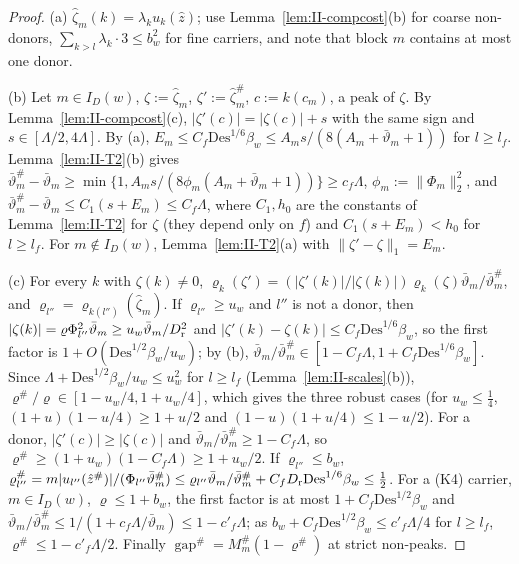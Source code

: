 \documentclass[10pt]{amsart}
\theoremstyle{definition}
\theoremstyle{remark}
\newcommand{\gap}{\operatorname{gap}}
\newcommand{\zh}{\hat z}
\begin{document}
\begin{proof}
(a) $\hat\zeta_m(k)=\lambda_ku_k(\zh)$; use Lemma~\ref{lem:II-compcost}(b)
for coarse non-donors, $\sum_{k>l}\lambda_k\cdot3\le b_w^2$ for fine
carriers, and note that block $m$ contains at most one donor.

(b) Let $m\in I_D(w)$, $\zeta:=\hat\zeta_m$, $\zeta':=\hat\zeta^\#_m$,
$c:=k(c_m)$, a peak of $\zeta$.  By Lemma~\ref{lem:II-compcost}(c),
$|\zeta'(c)|=|\zeta(c)|+s$ with the same sign and $s\in[\Lambda/2,4\Lambda]$.
By (a), $E_m\le C_f\mathrm{Des}^{1/6}\beta_w\le A_ms/(8(A_m+\bar\vartheta_m+1))$ for
$l\ge l_f$.  Lemma~\ref{lem:II-T2}(b) gives $\bar\vartheta^\#_m-\bar\vartheta_m\ge\min\{1,
A_ms/(8\phi_m(A_m+\bar\vartheta_m+1))\}\ge c_f\Lambda$, $\phi_m:=\|\Phi_m\|_2^2$, and
$\bar\vartheta^\#_m-\bar\vartheta_m\le C_1(s+E_m)\le C_f\Lambda$, where $C_1,h_0$ are the
constants of Lemma~\ref{lem:II-T2} for $\zeta$ (they depend only on $f$) and
$C_1(s+E_m)<h_0$ for $l\ge l_f$.  For $m\notin I_D(w)$,
Lemma~\ref{lem:II-T2}(a) with $\|\zeta'-\zeta\|_1=E_m$.

(c) For every $k$ with $\zeta(k)\ne0$, $\varrho_k(\zeta')=(|\zeta'(k)|/
|\zeta(k)|)\varrho_k(\zeta)\bar\vartheta_m/\bar\vartheta^\#_m$, and $\varrho_{l''}=
\varrho_{k(l'')}(\hat\zeta_m)$.  If $\varrho_{l''}\ge u_w$ and $l''$ is not a
donor, then $|\zeta(k)|=\varrho\Phi_{l''}^2\bar\vartheta_m\ge u_w\bar\vartheta_m/D_{\rm r}^2$ and
$|\zeta'(k)-\zeta(k)|\le C_f\mathrm{Des}^{1/6}\beta_w$, so the first factor is
$1+O(\mathrm{Des}^{1/2}\beta_w/u_w)$; by (b), $\bar\vartheta_m/\bar\vartheta^\#_m\in[1-C_f
\Lambda,1+C_f\mathrm{Des}^{1/6}\beta_w]$.  Since $\Lambda+\mathrm{Des}^{1/2}
\beta_w/u_w\le u_w^{2}$ for $l\ge l_f$ (Lemma~\ref{lem:II-scales}(b)),
$\varrho^\#/\varrho\in[1-u_w/4,1+u_w/4]$, which gives the three robust cases
(for $u_w\le\frac14$, $(1+u)(1-u/4)\ge1+u/2$ and $(1-u)(1+u/4)\le1-u/2$).  For
a donor, $|\zeta'(c)|\ge|\zeta(c)|$ and $\bar\vartheta_m/\bar\vartheta^\#_m\ge1-C_f\Lambda$,
so $\varrho^\#\ge(1+u_w)(1-C_f\Lambda)\ge1+u_w/2$.  If $\varrho_{l''}\le b_w$,
$\varrho^\#_{l''}=m|u_{l''}(\zh^\#)|/(\Phi_{l''}\bar\vartheta^\#_m)\le\varrho_{l''}\bar\vartheta_m/
\bar\vartheta^\#_m+C_fD_{\rm r}\mathrm{Des}^{1/6}\beta_w\le\frac12$.  For a (K4)
carrier, $m\in I_D(w)$, $\varrho\le1+b_w$, the first factor is at most $1+C_f
\mathrm{Des}^{1/2}\beta_w$ and $\bar\vartheta_m/\bar\vartheta^\#_m\le1/(1+c_f\Lambda/
\bar\vartheta_m)\le1-c'_f\Lambda$; as $b_w+C_f\mathrm{Des}^{1/2}\beta_w\le c'_f
\Lambda/4$ for $l\ge l_f$, $\varrho^\#\le1-c'_f\Lambda/2$.  Finally $\gap^\#=
M^\#_m(1-\varrho^\#)$ at strict non-peaks.


\end{proof}
\end{document}
